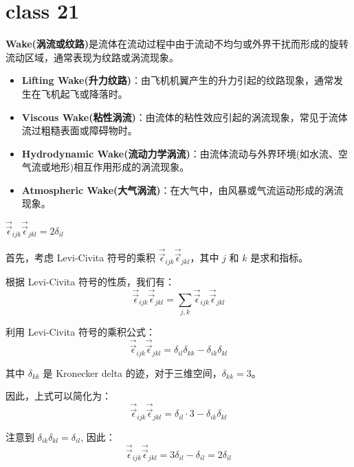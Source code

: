 \section{class 21}
\begin{defn}

    \textbf{Wake(涡流或纹路)}是流体在流动过程中由于流动不均匀或外界干扰而形成的旋转流动区域，通常表现为纹路或涡流现象。
    \begin{itemize}
        \item \textbf{Lifting Wake(升力纹路)}：由飞机机翼产生的升力引起的纹路现象，通常发生在飞机起飞或降落时。
        \item \textbf{Viscous Wake(粘性涡流)}：由流体的粘性效应引起的涡流现象，常见于流体流过粗糙表面或障碍物时。
        \item \textbf{Hydrodynamic Wake(流动力学涡流)}：由流体流动与外界环境(如水流、空气流或地形)相互作用形成的涡流现象。
        \item \textbf{Atmospheric Wake(大气涡流)}：在大气中，由风暴或气流运动形成的涡流现象。
    \end{itemize}
\end{defn}
\begin{proposition}
  
    \(\vec{\vec{\epsilon}}_{ijk}\vec{\vec{\epsilon}}_{jkl} = 2\delta_{il}\)
    \begin{tui}
    首先，考虑 Levi-Civita 符号的乘积 \(\vec{\vec{\epsilon}}_{ijk}\vec{\vec{\epsilon}}_{jkl}\)，其中 \(j\) 和 \(k\) 是求和指标。
    
    根据 Levi-Civita 符号的性质，我们有：
    \[
    \vec{\vec{\epsilon}}_{ijk}\vec{\vec{\epsilon}}_{jkl} = \sum_{j,k} \vec{\vec{\epsilon}}_{ijk}\vec{\vec{\epsilon}}_{jkl}
    \]
    
    利用 Levi-Civita 符号的乘积公式：
    \[
    \vec{\vec{\epsilon}}_{ijk}\vec{\vec{\epsilon}}_{jkl} = \delta_{il}\delta_{kk} - \delta_{ik}\delta_{kl}
    \]
    
    其中 \(\delta_{kk}\) 是 Kronecker delta 的迹，对于三维空间，\(\delta_{kk} = 3\)。
    
    因此，上式可以简化为：
    \[
    \vec{\vec{\epsilon}}_{ijk}\vec{\vec{\epsilon}}_{jkl} = \delta_{il} \cdot 3 - \delta_{ik}\delta_{kl}
    \]

    注意到 \(\delta_{ik}\delta_{kl} = \delta_{il}\),    
    因此：
    \[
    \vec{\vec{\epsilon}}_{ijk}\vec{\vec{\epsilon}}_{jkl} = 3\delta_{il} - \delta_{il} = 2\delta_{il}
    \]
\end{tui}
\end{proposition}
